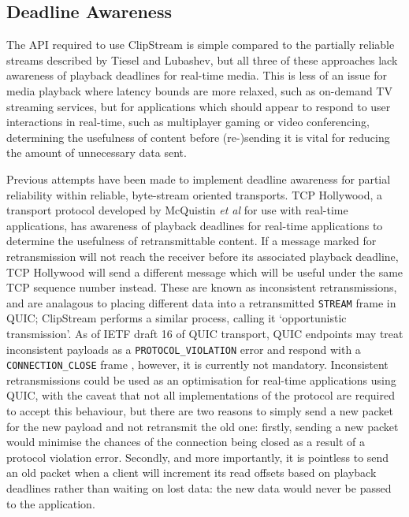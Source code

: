 \documentclass{mpaper}
\begin{document}
\subsection{Deadline Awareness}

The API required to use ClipStream is simple compared to the partially reliable streams described by Tiesel and Lubashev, but all three of these approaches lack awareness of playback deadlines for real-time media. This is less of an issue for media playback where latency bounds are more relaxed, such as on-demand TV streaming services, but for applications which should appear to respond to user interactions in real-time, such as multiplayer gaming or video conferencing, determining the usefulness of content before (re-)sending it is vital for reducing the amount of unnecessary data sent.

Previous attempts have been made to implement deadline awareness for partial reliability within reliable, byte-stream oriented transports. TCP Hollywood, a transport protocol developed by McQuistin \textit{et al} \cite{McQuistin2016} for use with real-time applications, has awareness of playback deadlines for real-time applications to determine the usefulness of retransmittable content. If a message marked for retransmission will not reach the receiver before its associated playback deadline, TCP Hollywood will send a different message which will be useful under the same TCP sequence number instead. These are known as inconsistent retransmissions, and are analagous to placing different data into a retransmitted \texttt{STREAM} frame in QUIC; ClipStream performs a similar process, calling it `opportunistic transmission'. As of IETF draft 16 of QUIC transport, QUIC endpoints may treat inconsistent payloads as a \texttt{PROTOCOL\_VIOLATION} error and respond with a \texttt{CONNECTION\_CLOSE} frame \cite{quic-transport-16}, however, it is currently not mandatory. Inconsistent retransmissions could be used as an optimisation for real-time applications using QUIC, with the caveat that not all implementations of the protocol are required to accept this behaviour, but there are two reasons to simply send a new packet for the new payload and not retransmit the old one: firstly, sending a new packet would minimise the chances of the connection being closed as a result of a protocol violation error. Secondly, and more importantly, it is pointless to send an old packet when a client will increment its read offsets based on playback deadlines rather than waiting on lost data: the new data would never be passed to the application.
\end{document}
